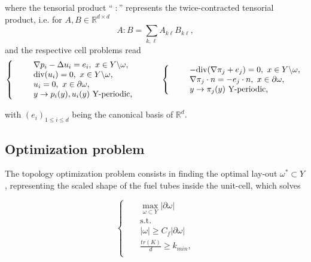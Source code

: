 \documentclass{article}
\def\div{ {\rm div}}
\newcommand{\Rbb} {\mathbb{R}}
\begin{document}
where the tensorial product ``$\;:$'' represents the twice-contracted tensorial product, i.e. for $A,B\in \Rbb^{d\times d}$
\[
A:B=\sum \limits_{k,\ell}A_{k\ell}B_{k\ell},
\]
and the respective cell problems read
\begin{equation}
\label{cell_problem}
\left\{ \begin{array}{rcll}
&&\nabla p_i-\Delta u_i=e_i, \mbox{ }x\in Y\backslash \omega,\\
&&\mbox{div}(u_i)=0, \mbox{ }x\in Y\backslash \omega,\\
&&u_i=0,\mbox{ } x\in \partial \omega,\\
&&y\rightarrow p_i(y),u_i(y) \mbox{ Y-periodic,}
\end{array} \right.
\hspace{1cm}
\left\{ \begin{array}{rcll}
&&-\div(\nabla \pi_j+e_j)=0 , \mbox{ }x\in Y\backslash \omega,\\
&&\nabla \pi_j \cdot n=-e_j \cdot n,\mbox{ } x\in \partial \omega,\\
&&y\rightarrow \pi_j(y) \mbox{ Y-periodic,}
\end{array} \right.
\end{equation}

with $(e_i)_{1\leq i\leq d}$ being the canonical basis of $\mathbb{R}^d$.\\

 
\subsection{Optimization problem}
  
The topology optimization problem {consists} in finding the optimal lay-out $\omega^*\subset Y$, representing the scaled shape of the fuel tubes inside the unit-cell, which solves


\begin{equation}
\label{optim_problem}
\left\{ \begin{array}{rcll}
&&\max\limits_{\omega\subset Y} |\partial \omega|\\
&&\mbox{s.t.}\\
 &&|\omega| \geq C_f|\partial \omega|\,\\ && \frac{tr(K)}{d}\geq k_{min},\\ \end{array} \right.
\end{equation}
\end{document}
